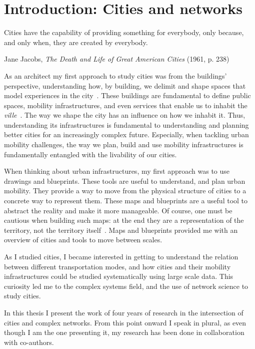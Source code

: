 \chapter{Introduction: Cities and networks}

\epigraph{Cities have the capability of providing something for everybody, only because, and only when, they are created by everybody.}{Jane Jacobs, \textit{The Death and Life of Great American Cities} (1961, p. 238)}

As an architect my first approach to study cities was from the buildings' perspective, understanding how, by building, we delimit and shape spaces that model experiences in the city~\cite{gehl1971life}. These buildings are fundamental to define public spaces, mobility infrastructures, and even services that enable us to inhabit the \textit{ville}~\cite{sennett2018building}. The way we shape the city has an influence on how we inhabit it. Thus, understanding its infrastructures is fundamental to understanding and planning better cities for an increasingly complex future. Especially, when tackling urban mobility challenges, the way we plan, build and use mobility infrastructures is fundamentally entangled with the livability of our cities.

When thinking about urban infrastructures, my first approach was to use drawings and blueprints. These tools are useful to understand, and plan urban mobility. They provide a way to move from the physical structure of cities to a concrete way to represent them. These maps and blueprints are a useful tool to abstract the reality and make it more manageable. Of course, one must be cautious when building such maps: at the end they are a representation of the territory, not the territory itself~\cite{borges1961hacedor}. Maps and blueprints provided me with an overview of cities and tools to move between scales.

As I studied cities, I became interested in getting to understand the relation between different transportation modes, and how cities and their mobility infrastructures could be studied systematically using large scale data. This curiosity led me to the complex systems field, and the use of network science to study cities. 

In this thesis I present the work of four years of research in the intersection of cities and complex networks. From this point onward I speak in plural, as even though I am the one presenting it, my research has been done in collaboration with co-authors. 


